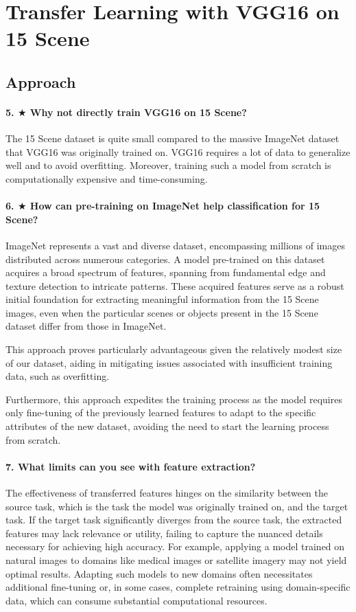 \section{Transfer Learning with VGG16 on 15 Scene}
\subsection{Approach}
\paragraph{5. $\bigstar$ Why not directly train VGG16 on 15 Scene?}
The 15 Scene dataset is quite small compared to the massive ImageNet dataset that VGG16 was originally trained on. VGG16 requires a lot of data to generalize well and to avoid overfitting. Moreover, training such a model from scratch is computationally expensive and time-consuming.


\paragraph{6. $\bigstar$ How can pre-training on ImageNet help classification for 15 Scene?}
ImageNet represents a vast and diverse dataset, encompassing millions of images distributed across numerous categories. A model pre-trained on this dataset acquires a broad spectrum of features, spanning from fundamental edge and texture detection to intricate patterns. These acquired features serve as a robust initial foundation for extracting meaningful information from the 15 Scene images, even when the particular scenes or objects present in the 15 Scene dataset differ from those in ImageNet. 

This approach proves particularly advantageous given the relatively modest size of our dataset, aiding in mitigating issues associated with insufficient training data, such as overfitting. 

Furthermore, this approach expedites the training process as the model requires only fine-tuning of the previously learned features to adapt to the specific attributes of the new dataset, avoiding the need to start the learning process from scratch.

\paragraph{7. What limits can you see with feature extraction?}
The effectiveness of transferred features hinges on the similarity between the source task, which is the task the model was originally trained on, and the target task. If the target task significantly diverges from the source task, the extracted features may lack relevance or utility, failing to capture the nuanced details necessary for achieving high accuracy. For example, applying a model trained on natural images to domains like medical images or satellite imagery may not yield optimal results. Adapting such models to new domains often necessitates additional fine-tuning or, in some cases, complete retraining using domain-specific data, which can consume substantial computational resources.

